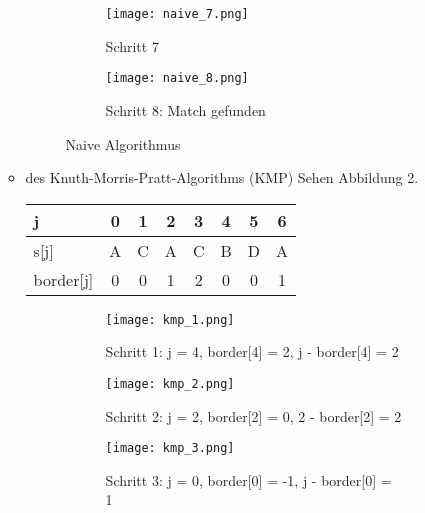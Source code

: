 \documentclass{article}
\begin{document}
\begin{flushleft}
\begin{enumerate}[(a)]
\begin{itemize}
\begin{figure}
            \begin{subfigure}{0.3\textwidth}
                \centering
                \texttt{[image: naive\_7.png]}
                \caption{Schritt 7}
            \end{subfigure}
            \begin{subfigure}{0.3\textwidth}
                \centering
                \texttt{[image: naive\_8.png]}
                \caption{Schritt 8: Match gefunden}
            \end{subfigure}
        \caption{Naive Algorithmus}
        \end{figure}
        \item des Knuth-Morris-Pratt-Algorithms (KMP)
        \newline
        Sehen Abbildung 2.
        \newline \\
        \begin{tabular}{||l|c|c|c|c|c|c|c||}
            \hline j & 0 & 1 & 2 & 3 & 4 & 5 & 6 \\
            \hline s[j] & A & C & A & C & B & D & A \\
            \hline border[j] & 0 & 0 & 1 & 2 & 0 & 0 & 1 \\
            \hline
        \end{tabular}
        \newline
        \begin{figure}
            \centering
            \begin{subfigure}{0.3\textwidth}
                \centering
                \texttt{[image: kmp\_1.png]}
                \caption{Schritt 1: j = 4, border[4] = 2, j - border[4] = 2}
            \end{subfigure}
            \begin{subfigure}{0.3\textwidth}
                \centering
                \texttt{[image: kmp\_2.png]}
                \caption{Schritt 2: j = 2, border[2] = 0, 2 - border[2] = 2}
            \end{subfigure}
            \begin{subfigure}{0.3\textwidth}
                \centering
                \texttt{[image: kmp\_3.png]}
                \caption{Schritt 3: j = 0, border[0] = -1, j - border[0] = 1}
            \end{subfigure}
            \begin{subfigure}{0.3\textwidth}
                \centering

\end{subfigure}
\end{figure}
\end{itemize}
\end{enumerate}
\end{flushleft}
\end{document}
